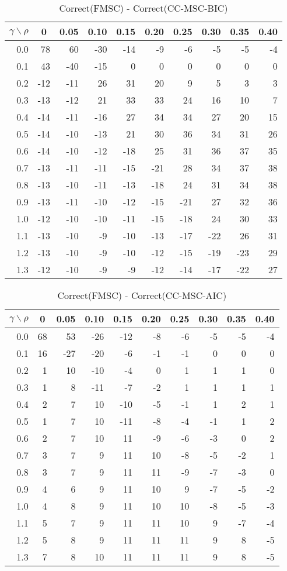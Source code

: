 \documentclass[12pt]{article}
\begin{document}
\begin{table}[!tbp]
\caption{Correct(FMSC) - Correct(CC-MSC-BIC)}
 \begin{center}
 \begin{tabular}{r|rrrrrrrrr}\hline\hline
\multicolumn{1}{c|}{$\gamma\backslash\rho$}&\multicolumn{1}{c}{0}&\multicolumn{1}{c}{0.05}&\multicolumn{1}{c}{0.10}&\multicolumn{1}{c}{0.15}&\multicolumn{1}{c}{0.20}&\multicolumn{1}{c}{0.25}&\multicolumn{1}{c}{0.30}&\multicolumn{1}{c}{0.35}&\multicolumn{1}{c}{0.40}\tabularnewline
\hline


0.0& 78& 60&-30&-14& -9& -6& -5& -5&-4\tabularnewline
0.1& 43&-40&-15&  0&  0&  0&  0&  0& 0\tabularnewline
0.2&-12&-11& 26& 31& 20&  9&  5&  3& 3\tabularnewline
0.3&-13&-12& 21& 33& 33& 24& 16& 10& 7\tabularnewline
0.4&-14&-11&-16& 27& 34& 34& 27& 20&15\tabularnewline
0.5&-14&-10&-13& 21& 30& 36& 34& 31&26\tabularnewline
0.6&-14&-10&-12&-18& 25& 31& 36& 37&35\tabularnewline
0.7&-13&-11&-11&-15&-21& 28& 34& 37&38\tabularnewline
0.8&-13&-10&-11&-13&-18& 24& 31& 34&38\tabularnewline
0.9&-13&-11&-10&-12&-15&-21& 27& 32&36\tabularnewline
1.0&-12&-10&-10&-11&-15&-18& 24& 30&33\tabularnewline
1.1&-13&-10& -9&-10&-13&-17&-22& 26&31\tabularnewline
1.2&-13&-10& -9&-10&-12&-15&-19&-23&29\tabularnewline
1.3&-12&-10& -9& -9&-12&-14&-17&-22&27\tabularnewline
\hline
\end{tabular}

\end{center}

\end{table}

%

\begin{table}[!tbp]
\caption{Correct(FMSC) - Correct(CC-MSC-AIC)}
 \begin{center}
 \begin{tabular}{r|rrrrrrrrr}\hline\hline
\multicolumn{1}{c|}{$\gamma\backslash\rho$}&\multicolumn{1}{c}{0}&\multicolumn{1}{c}{0.05}&\multicolumn{1}{c}{0.10}&\multicolumn{1}{c}{0.15}&\multicolumn{1}{c}{0.20}&\multicolumn{1}{c}{0.25}&\multicolumn{1}{c}{0.30}&\multicolumn{1}{c}{0.35}&\multicolumn{1}{c}{0.40}\tabularnewline
\hline


0.0&68& 53&-26&-12&-8&-6&-5&-5&-4\tabularnewline
0.1&16&-27&-20& -6&-1&-1& 0& 0& 0\tabularnewline
0.2& 1& 10&-10& -4& 0& 1& 1& 1& 0\tabularnewline
0.3& 1&  8&-11& -7&-2& 1& 1& 1& 1\tabularnewline
0.4& 2&  7& 10&-10&-5&-1& 1& 2& 1\tabularnewline
0.5& 1&  7& 10&-11&-8&-4&-1& 1& 2\tabularnewline
0.6& 2&  7& 10& 11&-9&-6&-3& 0& 2\tabularnewline
0.7& 3&  7&  9& 11&10&-8&-5&-2& 1\tabularnewline
0.8& 3&  7&  9& 11&11&-9&-7&-3& 0\tabularnewline
0.9& 4&  6&  9& 11&10& 9&-7&-5&-2\tabularnewline
1.0& 4&  8&  9& 11&10&10&-8&-5&-3\tabularnewline
1.1& 5&  7&  9& 11&11&10& 9&-7&-4\tabularnewline
1.2& 5&  8&  9& 11&11&11& 9& 8&-5\tabularnewline
1.3& 7&  8& 10& 11&11&11& 9& 8&-5\tabularnewline
\hline
\end{tabular}

\end{center}

\end{table}
\end{document}
